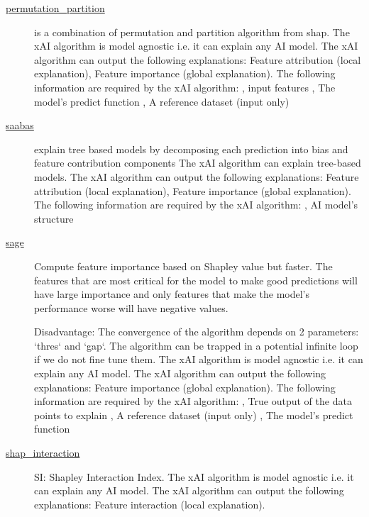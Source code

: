 \begin{description}
\item[\href{https://github.com/Karim-53/Compare-xAI/blob/main/explainers/shap_explainer.py}{permutation\_partition}] 
 
is a combination of permutation and partition algorithm from shap. 
The xAI algorithm is model agnostic i.e. it can explain any AI model. 
The xAI algorithm can output the following explanations: Feature attribution (local explanation), Feature importance (global explanation). 
The following information are required by the xAI algorithm: 
			 , input features
			 , The model's predict function
			 , A reference dataset (input only)

\item[\href{https://github.com/Karim-53/Compare-xAI/blob/main/explainers/saabas.py}{saabas}] 
 
explain tree based models by decomposing each prediction into bias and feature contribution components 
The xAI algorithm can explain tree-based models. 
The xAI algorithm can output the following explanations: Feature attribution (local explanation), Feature importance (global explanation). 
The following information are required by the xAI algorithm: 
			 , AI model's structure

\item[\href{https://github.com/Karim-53/Compare-xAI/blob/main/explainers/sage_explainer.py}{sage}] 
 \citep{covert2020understanding} 
Compute feature importance based on Shapley value but faster. The features that are most critical for the model to make good predictions will have large importance and only features that make the model's performance worse will have negative values.

Disadvantage: The convergence of the algorithm depends on 2 parameters: `thres` and `gap`. The algorithm can be trapped in a potential infinite loop if we do not fine tune them. 
The xAI algorithm is model agnostic i.e. it can explain any AI model. 
The xAI algorithm can output the following explanations: Feature importance (global explanation). 
The following information are required by the xAI algorithm: 
			 , True output of the data points to explain
			 , A reference dataset (input only)
			 , The model's predict function

\item[\href{https://github.com/Karim-53/Compare-xAI/blob/main/explainers/shap_interaction.py}{shap\_interaction}] 
 \citep{owen1972multilinear} 
SI: Shapley Interaction Index. 
The xAI algorithm is model agnostic i.e. it can explain any AI model. 
The xAI algorithm can output the following explanations: Feature interaction (local explanation). 



\end{description}
